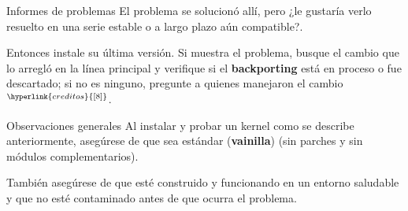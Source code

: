 \begin{frame}[c]{Informes de problemas}
  El problema se solucionó allí, pero ¿le gustaría verlo resuelto en una
  serie estable o a largo plazo aún compatible?.

  \vspace{\baselineskip}
  Entonces instale su última versión. Si muestra el problema, busque el
  cambio que lo arregló en la línea principal y verifique si el
  \textbf{backporting} está en proceso o fue descartado; si no es
  ninguno, pregunte a quienes manejaron el
  cambio$^{\hyperlink{creditos}{[8]}}$.

  \vspace{\baselineskip}
  \begin{alertblock}{Observaciones generales}
    Al instalar y probar un kernel como se describe anteriormente,
    asegúrese de que sea estándar (\textbf{vainilla}) (sin parches y sin
    módulos complementarios).

    \vspace{\baselineskip}
    También asegúrese de que esté construido y funcionando en un
    entorno saludable y que no esté contaminado antes de que ocurra
    el problema.
  \end{alertblock}

\end{frame}

%
%
